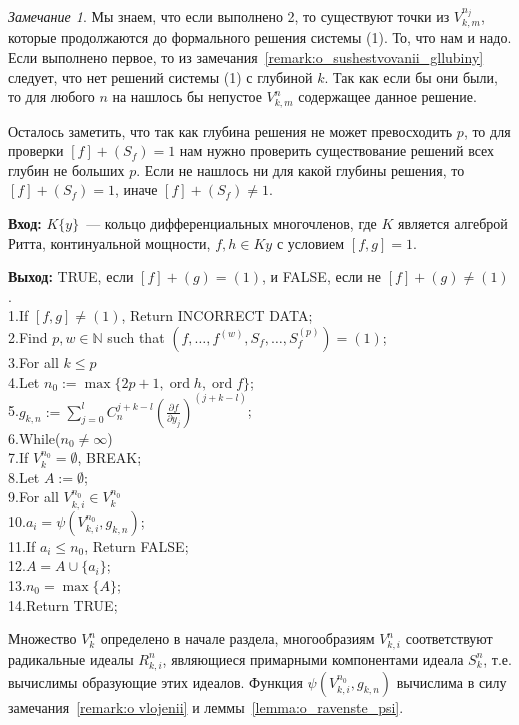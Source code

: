 \documentclass[16pt]{article}
\DeclareMathOperator{\ord}{ord}
\renewcommand{\le}{\leqslant} %
\theoremstyle{plain1}
\theoremstyle{plain2}
\theoremstyle{plain}
\theoremstyle{plain3}
\theoremstyle{definition}
\theoremstyle{remark}
\newtheorem{remark}[theorem1]{Замечание}
\begin{document}
\begin{remark}
Мы знаем, что если выполнено 2, то существуют точки из ${V}_{k,m}^{n_j}$, которые продолжаются до формального решения системы (1). То, что нам и надо. Если выполнено первое, то из замечания~\ref{remark:o_sushestvovanii_gllubiny} следует, что нет решений системы (1)  с глубиной $k$. Так как если бы они были, то для любого $n$ на нашлось бы непустое ${V}_{k,m}^{n}$ содержащее данное решение.

Осталось заметить, что так как глубина решения не может превосходить $p$, то для проверки $[f]+(S_f)=1$ нам нужно проверить существование решений всех глубин не больших $p$. Если не нашлось ни для какой глубины решения, то $[f]+(S_f)=1$, иначе $[f]+(S_f)\neq1$.
\end{remark}

{\bf Вход:} $K\{y\}$~--- кольцо дифференциальных многочленов, где $K$ является алгеброй Ритта, континуальной мощности, $f,h\in K{y}$ с условием $[f,g]=1$.

{\bf Выход:} TRUE, если  $[f]+(g)=(1)$, и FALSE, если не $[f]+(g)\not=(1)$.
\\
1.\qquad If $[f,g]\not=(1)$, Return  INCORRECT DATA;\\
2.\qquad Find $p,w\in \mathbb{N}$ such that $(f,\ldots,f^{(w)},S_f,\ldots,S_f^{(p)})=(1)$;\\
3.\qquad For all $k\le p$\\
4.\qquad\qquad Let $n_0:=\max\{ 2p+1,\ord{h},\ord{f}\}$;\\
5.\qquad\qquad $g_{k,n}:=\sum\limits_{j=0}^{l}C_n^{j+k - l }\left(\frac{\partial f}{\partial y_j}\right)^{(j+k - l)}$;\\
6.\qquad\qquad While($n_0\not=\infty$)\\
7.\qquad\qquad\qquad If $V_k^{n_0}=\emptyset$, BREAK;\\
8.\qquad\qquad\qquad Let $A:=\emptyset$;\\
9.\qquad\qquad\qquad For all ${V}_{k,i}^{n_0}\in V_k^{n_0}$\\
10.\qquad\qquad\qquad\qquad $a_i=\psi({V}_{k,i}^{n_0},g_{k,n})$;\\
11.\qquad\qquad\qquad\qquad If $a_i\le n_0$, Return FALSE;\\
12.\qquad\qquad\qquad\qquad $A=A\cup\{a_i\}$;\\
13.\qquad\qquad\qquad $n_0=\max\{A\}$;\\
14.\qquad Return TRUE;

Множество $V_k^{n}$ определено в начале раздела, многообразиям ${V}_{k,i}^{n}$ соответствуют радикальные идеалы $R_{k,i}^{n}$, являющиеся примарными компонентами идеала $S_k^n$, т.е. вычислимы образующие этих идеалов. 
Функция $\psi({V}_{k,i}^{n_0},g_{k,n})$ вычислима в силу замечания~\ref{remark:o vlojenii} и леммы~\ref{lemma:o_ravenste_psi}.
\end{document}
